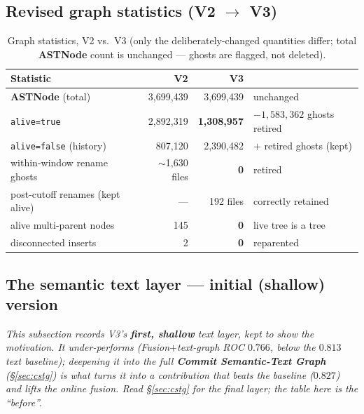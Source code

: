 \documentclass[11pt,a4paper]{article}
\newcommand{\code}[1]{\texttt{#1}}
\newcommand{\node}[1]{\textcolor{kgblue}{\textbf{#1}}}
\begin{document}
	\subsection{\texorpdfstring{Revised graph statistics (V2 $\rightarrow$ V3)}{Revised graph statistics (V2 to V3)}}\label{sec:v3stat}
	\begin{table}[H]\centering\small
	\caption{Graph statistics, V2 vs.\ V3 (only the deliberately-changed quantities
	differ; total \node{ASTNode} count is unchanged --- ghosts are flagged, not
	deleted).}\label{tab:v3stat}
	\begin{tabular}{@{}lrrl@{}}
	\toprule
	\textbf{Statistic} & \textbf{V2} & \textbf{V3} & \\
	\midrule
	\node{ASTNode} (total)            & 3{,}699{,}439 & 3{,}699{,}439 & unchanged\\
	\code{alive=true}                 & 2{,}892{,}319 & \textbf{1{,}308{,}957} & $-1{,}583{,}362$ ghosts retired\\
	\code{alive=false} (history)      & 807{,}120     & 2{,}390{,}482 & $+$ retired ghosts (kept)\\
	within-window rename ghosts       & $\sim$1{,}630 files & \textbf{0} & retired\\
	post-cutoff renames (kept alive)  & ---           & 192 files & correctly retained\\
	alive multi-parent nodes          & 145           & \textbf{0} & live tree is a tree\\
	disconnected inserts              & 2             & \textbf{0} & reparented\\
	\bottomrule
	\end{tabular}
	\end{table}

	\subsection{The semantic text layer --- initial (shallow) version}\label{sec:v3text}
	\emph{This subsection records V3's \textbf{first, shallow} text layer, kept to show
	the motivation. It under-performs (Fusion$+$text-graph ROC $0.766$, below the $0.813$
	text baseline); deepening it into the full \textbf{Commit Semantic-Text Graph}
	(\S\ref{sec:cstg}) is what turns it into a contribution that beats the baseline
	($0.827$) and lifts the online fusion. Read \S\ref{sec:cstg} for the final layer;
	the table here is the ``before''.}
\end{document}
